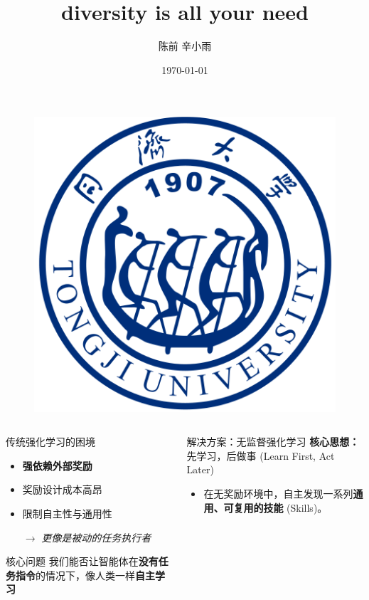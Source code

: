 \documentclass{beamer}
\author[Author]{陈前 辛小雨}
\title{diversity is all your need}
\institute{同济大学}
\date{\today}
\begin{document}
\begin{frame}
    \titlepage
    \begin{figure}[htpb]
       \begin{center}
            \includegraphics[width=0.2\linewidth]{pic/tongji_logo.png}
        \end{center}
    \end{figure}
\end{frame}

\begin{frame}
\tiny
     \begin{columns}[T] %

         \begin{column}{0.5\textwidth}
            \begin{block}{传统强化学习的困境}
                \begin{itemize}
                    \item \textbf{强依赖外部奖励}
                    \item 奖励设计成本高昂
                    \item 限制自主性与通用性
                    \item[$\rightarrow$] \textit{更像是被动的任务执行者}
                \end{itemize}
            \end{block}

            \begin{alertblock}{核心问题}
                 我们能否让智能体在\textbf{没有任务指令}的情况下，像人类一样\textbf{自主学习}
            \end{alertblock}
        \end{column}
        \begin{column}{0.5\textwidth}
            \begin{block}{解决方案：无监督强化学习}
                \textbf{核心思想：} 先学习，后做事 (Learn First, Act Later)
                \begin{itemize}
                    \item 在无奖励环境中，自主发现一系列\textbf{通用、可复用的技能} (Skills)。
                \end{itemize}
            \end{block}


\end{column}
\end{columns}
\end{frame}
\end{document}
